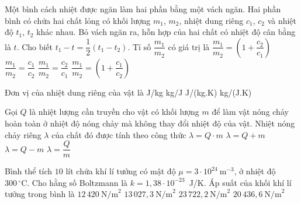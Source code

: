 	\begin{ex}%
		Một bình cách nhiệt được ngăn làm hai phần bằng một vách ngăn. Hai phần bình có chứa hai chất lỏng có khối lượng $m_1$, $m_2$, nhiệt dung riêng $c_1$, $c_2$ và nhiệt độ $t_1$, $t_2$ khác nhau. Bỏ vách ngăn ra, hỗn hợp của hai chất có nhiệt độ cân bằng là $t$. Cho biết $t_1-t=\dfrac{1}{2}\left(t_1-t_2\right)$. Tỉ số $\dfrac{m_1}{m_2}$ có giá trị là
		\choice
		{$\dfrac{m_1}{m_2}=\left(1+\dfrac{c_2}{c_1}\right)$}
		{$\dfrac{m_1}{m_2}=\dfrac{c_1}{c_2}$}
		{\True $\dfrac{m_1}{m_2}=\dfrac{c_2}{c_1}$}
		{$\dfrac{m_1}{m_2}=\left(1+\dfrac{c_1}{c_2}\right)$}
	\end{ex}

	\begin{ex}%
		Đơn vị của nhiệt dung riêng của vật là
		\choice
		{J/kg}
		{kg/J}
		{\True J/(kg.K)}
		{kg/(J.K)}
	\end{ex}

	\begin{ex}%
		Gọi $Q$ là nhiệt lượng cần truyền cho vật có khối lượng $m$ để làm vật nóng chảy hoàn toàn ở nhiệt độ nóng chảy mà không thay đổi nhiệt độ của vật. Nhiệt nóng chảy riêng $\lambda$ của chất đó được tính theo công thức
		\choice
		{$\lambda=Q\cdot m$}
		{$\lambda=Q+m$}
		{$\lambda=Q-m$}
		{\True $\lambda=\dfrac{Q}{m}$}
	\end{ex}

	\begin{ex}%
		Bình thể tích $10$ lít chứa khí lí tưởng có mật độ $\mu=3\cdot 10^{24}~\text{m}^{-3}$, ở nhiệt độ $300\,^\circ\text{C}$. Cho hằng số Boltzmann là $k=1{,}38\cdot 10^{-23}$~J/K. Áp suất của khối khí lí tưởng trong bình là
		\choice
		{$12\,420~\text{N/m}^2$}
		{$13\,027{,}3~\text{N/m}^2$}
		{\True $23\,722{,}2~\text{N/m}^2$}
		{$20\,436{,}6~\text{N/m}^2$}
	\end{ex}

